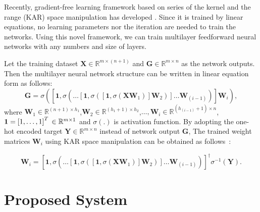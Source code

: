 \documentclass[runningheads]{llncs}
\begin{document}
Recently, gradient-free learning framework based on series of the kernel and the range (KAR) space manipulation has developed \cite{toh2018learning,toh2018gradient}.
Since it is trained by linear equations, no learning parameters nor the iteration are needed to train the networks.
Using this novel framework, we can train multilayer feedforward neural networks with any numbers and size of layers.

Let the training dataset $\mathbf{X}\in{\mathbb{R}}^{m \times (n+1)}$ and $\mathbf{G}\in{\mathbb{R}}^{m \times n}$ as the network outputs.
Then the multilayer neural network structure can be written in linear equation form as follows:
\begin{equation}
    \mathbf{G} = \sigma\left(\left[\mathbf{1},\sigma\left(\dots\left[\mathbf{1},\sigma\left(\left[\mathbf{1},\sigma\left(\mathbf{X}\mathbf{W}_{1}\right)\right]\mathbf{W}_{2}\right)\right]\dots\mathbf{W}_{(i-1)}\right)\right]\mathbf{W}_{i}\right),
\end{equation}
where $\mathbf{W}_{1}\in{\mathbb{R}}^{(n+1) \times h_{1}}$,$\mathbf{W}_{2}\in{\mathbb{R}}^{(h_{1}+1) \times h_{2}}$,$\dots,\mathbf{W}_{i}\in{\mathbb{R}}^{(h_{(i-1)}+1) \times n}$,$\mathbf{1}=\left[1,\dots,1\right]^{T}\\
\in{\mathbb{R}}^{m \times 1}$ and $\sigma(.)$ is activation function.
By adopting the one-hot encoded target $\mathbf{Y}\in{\mathbb{R}}^{m \times n}$ instead of network output $\mathbf{G}$, The trained weight matrices $\mathbf{W}_{i}$ using KAR space manipulation can be obtained as follows~\cite{toh2018gradient}:

\begin{equation}
    \mathbf{W}_{i} = \left[\mathbf{1},\sigma\left(\dots\left[\mathbf{1},\sigma\left(\left[\mathbf{1},\sigma\left(\mathbf{X}\mathbf{W}_{1}\right)\right]\mathbf{W}_{2}\right)\right]\dots\mathbf{W}_{(i-1)}\right)\right]^{\dagger}\sigma^{-1}\left(\mathbf{Y}\right).
\end{equation}



\section{Proposed System}
\end{document}
